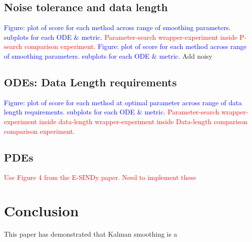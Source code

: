 \documentclass{article}
\begin{document}
\subsection{Noise tolerance and data length}
\textcolor{blue}{Figure: plot of score for each method across range of smoothing parameters.  subplots for each ODE \& metric}.  \textcolor{red}{Parameter-search wrapper-experiment inside P-search comparison experiment}.
\textcolor{blue}{Figure: plot of score for each method across range of smoothing parameters.  subplots for each ODE \& metric}. 
Add noisy 
\subsection{ODEs: Data Length requirements}
\textcolor{blue}{Figure: plot of score for each method at optimal parameter across range of data length requirements.  subplots for each ODE \& metric}.  \textcolor{red}{Parameter-search wrapper-experiment inside data-length wrapper-experiment inside Data-length comparison comparison experiment}.
\subsection{PDEs}
\textcolor{red}{Use Figure 4 from the E-SINDy paper. Need to implement these}
\section{Conclusion}
This paper has demonstrated that Kalman smoothing is a 
\end{document}
